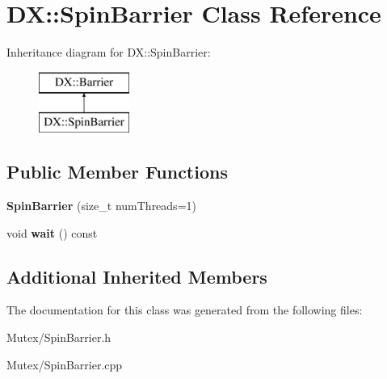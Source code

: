 \hypertarget{class_d_x_1_1_spin_barrier}{\section{D\-X\-:\-:Spin\-Barrier Class Reference}
\label{class_d_x_1_1_spin_barrier}
}
Inheritance diagram for D\-X\-:\-:Spin\-Barrier\-:\begin{figure}[H]
\begin{center}
\leavevmode
\includegraphics[height=2.000000cm]{class_d_x_1_1_spin_barrier}
\end{center}
\end{figure}
\subsection*{Public Member Functions}
\begin{DoxyCompactItemize}
\item 
\hypertarget{class_d_x_1_1_spin_barrier_a655779e1845cbefa59801553b2eafa2d}{{\bfseries Spin\-Barrier} (size\-\_\-t num\-Threads=1)}\label{class_d_x_1_1_spin_barrier_a655779e1845cbefa59801553b2eafa2d}

\item 
\hypertarget{class_d_x_1_1_spin_barrier_acc73c0fb586ae1694b65d2eb5c50c301}{void {\bfseries wait} () const }\label{class_d_x_1_1_spin_barrier_acc73c0fb586ae1694b65d2eb5c50c301}

\end{DoxyCompactItemize}
\subsection*{Additional Inherited Members}


The documentation for this class was generated from the following files\-:\begin{DoxyCompactItemize}
\item 
Mutex/Spin\-Barrier.\-h\item 
Mutex/Spin\-Barrier.\-cpp\end{DoxyCompactItemize}
